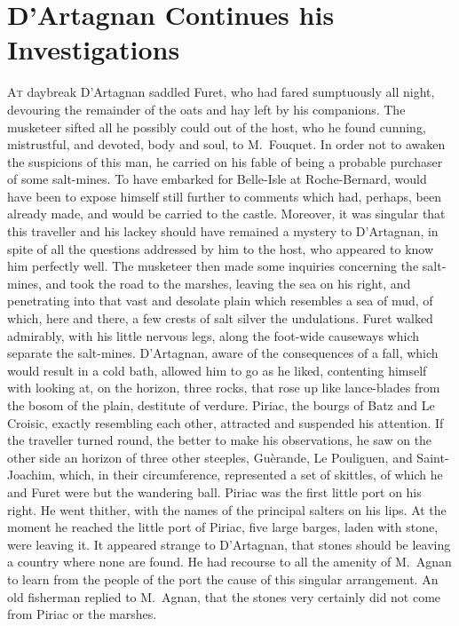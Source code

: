 \chapter{D'Artagnan Continues his Investigations}

\lettrine{A}{t} daybreak D'Artagnan saddled Furet, who had fared sumptuously all night, devouring the remainder of the oats and hay left by his companions. The musketeer sifted all he possibly could out of the host, who he found cunning, mistrustful, and devoted, body and soul, to M.~Fouquet. In order not to awaken the suspicions of this man, he carried on his fable of being a probable purchaser of some salt-mines. To have embarked for Belle-Isle at Roche-Bernard, would have been to expose himself still further to comments which had, perhaps, been already made, and would be carried to the castle. Moreover, it was singular that this traveller and his lackey should have remained a mystery to D'Artagnan, in spite of all the questions addressed by him to the host, who appeared to know him perfectly well. The musketeer then made some inquiries concerning the salt-mines, and took the road to the marshes, leaving the sea on his right, and penetrating into that vast and desolate plain which resembles a sea of mud, of which, here and there, a few crests of salt silver the undulations. Furet walked admirably, with his little nervous legs, along the foot-wide causeways which separate the salt-mines. D'Artagnan, aware of the consequences of a fall, which would result in a cold bath, allowed him to go as he liked, contenting himself with looking at, on the horizon, three rocks, that rose up like lance-blades from the bosom of the plain, destitute of verdure. Piriac, the bourgs of Batz and Le Croisic, exactly resembling each other, attracted and suspended his attention. If the traveller turned round, the better to make his observations, he saw on the other side an horizon of three other steeples, Guèrande, Le Pouliguen, and Saint-Joachim, which, in their circumference, represented a set of skittles, of which he and Furet were but the wandering ball. Piriac was the first little port on his right. He went thither, with the names of the principal salters on his lips. At the moment he reached the little port of Piriac, five large barges, laden with stone, were leaving it. It appeared strange to D'Artagnan, that stones should be leaving a country where none are found. He had recourse to all the amenity of M.~Agnan to learn from the people of the port the cause of this singular arrangement. An old fisherman replied to M.~Agnan, that the stones very certainly did not come from Piriac or the marshes.

